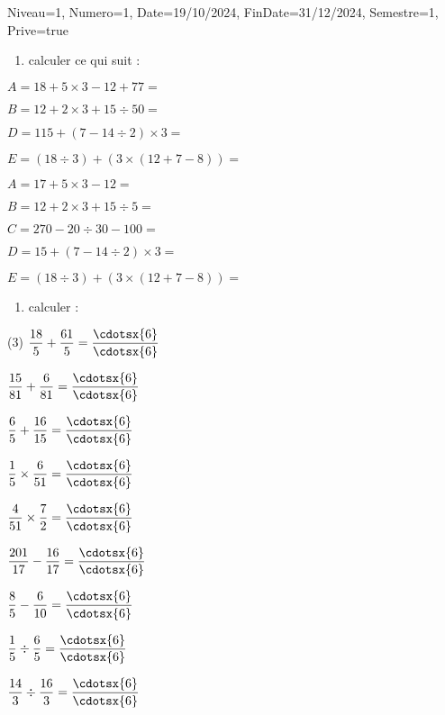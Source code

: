 \documentclass[a4paper,12pt]{article}
\begin{document}
\begin{Maquette}[DM]{Niveau=1, Numero=1, Date=19/10/2024, FinDate=31/12/2024, Semestre=1, Prive=true}

\begin{exercice}
\begin{enumerate}
\item calculer ce qui suit :
\end{enumerate}	
\begin{multicols}{2}	
  $ A=18+5\times 3-12+77=$
  \anserline[3]

$ B=12+2\times 3+15\div 50=$\anserline[3]

$ D=115+(7-14\div 2)\times 3=$\anserline[3]

$ E=(18\div 3)+(3\times(12+7-8))=$\anserline[3]\columnbreak
		
$ A=17+5\times 3-12=$\anserline[3]

$ B=12+2\times 3+15\div 5=$\anserline[3]

$ C=270-20\div 30-100=$\anserline[3]

$ D=15+(7-14\div 2)\times 3=$\anserline[3]

$ E=(18\div 3)+(3\times(12+7-8))=$\anserline[3]
	\end{multicols}
\end{exercice}

\begin{exercice}
	\begin{enumerate}[font=\bfseries]
		\item calculer :
		\end{enumerate}
\begin{tasks}(3)
\task\(\dfrac{18}{5}+\dfrac{61}{5}=\dfrac{\cdotsx{6}}{\cdotsx{6}}\)

\task\(\dfrac{15}{81}+\dfrac{6}{81}=\dfrac{\cdotsx{6}}{\cdotsx{6}}\)

\task\(\dfrac{6}{5}+\dfrac{16}{15}=\dfrac{\cdotsx{6}}{\cdotsx{6}}\)

\task\(\dfrac{1}{5}\times \dfrac{6}{51}=\dfrac{\cdotsx{6}}{\cdotsx{6}}\)

\task\(\dfrac{4}{51}\times\dfrac{7}{2}=\dfrac{\cdotsx{6}}{\cdotsx{6}}\)

\task\(\dfrac{201}{17}-\dfrac{16}{17}=\dfrac{\cdotsx{6}}{\cdotsx{6}}\)

\task\(\dfrac{8}{5}-\dfrac{6}{10}=\dfrac{\cdotsx{6}}{\cdotsx{6}}\)

\task\(\dfrac{1}{5}\div\dfrac{6}{5}=\dfrac{\cdotsx{6}}{\cdotsx{6}}\)

\task\(\dfrac{14}{3}\div\dfrac{16}{3}=\dfrac{\cdotsx{6}}{\cdotsx{6}}\)	
\end{tasks}
\vspace{10pt}	
\end{exercice}


\end{Maquette}
\end{document}
